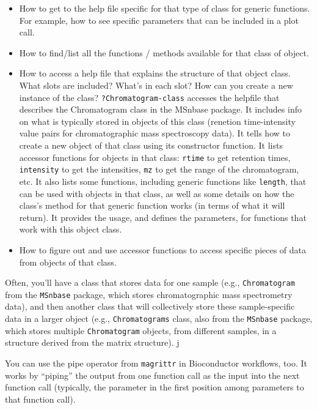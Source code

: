 \documentclass[]{tufte-book}
\providecommand{\tightlist}{%
  \setlength{\itemsep}{0pt}\setlength{\parskip}{0pt}}
\begin{document}
\begin{itemize}
\tightlist
\item
  How to get to the help file specific for that type of class for
  generic functions. For example, how to see specific parameters that
  can be included in a plot call.
\item
  How to find/list all the functions / methods available for that
  class of object.
\item
  How to access a help file that explains the structure of that object
  class. What slots are included? What's in each slot? How can you
  create a new instance of the class? \texttt{?\textasciigrave{}Chromatogram-class\textasciigrave{}}
  accesses the helpfile that describes the Chromatogram class in the
  MSnbase package. It includes info on what is typically stored in
  objects of this class (renetion time-intensity value pairs for chromatographic
  mass spectroscopy data). It tells how to create a new object of that
  class using its constructor function. It lists accessor functions for
  objects in that class: \texttt{rtime} to get retention times, \texttt{intensity} to
  get the intensities, \texttt{mz} to get the range of the chromatogram, etc.
  It also lists some functions, including generic functions like \texttt{length},
  that can be used with objects in that class, as well as some details on
  how the class's method for that generic function works (in terms of
  what it will return). It provides the usage, and defines the parameters,
  for functions that work with this object class.
\item
  How to figure out and use accessor functions to access specific
  pieces of data from objects of that class.
\end{itemize}

Often, you'll have a class that stores data for one sample (e.g.,
\texttt{Chromatogram} from the \texttt{MSnbase} package, which stores chromatographic
mass spectrometry data), and then another class that will collectively
store these sample-specific data in a larger object (e.g.,
\texttt{Chromatograms} class, also from the \texttt{MSnbase} package, which stores
multiple \texttt{Chromatogram} objects, from different samples, in a
structure derived from the matrix structure). j

You can use the pipe operator from \texttt{magrittr} in Bioconductor workflows,
too. It works by ``piping'' the output from one function call as the
input into the next function call (typically, the parameter in the
first position among parameters to that function call).
\end{document}
